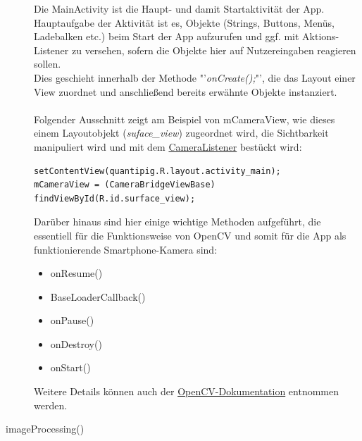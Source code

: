 \begin{description}
Die MainActivity ist die Haupt- und damit Startaktivität der App. Hauptaufgabe der Aktivität ist es, Objekte  (Strings, Buttons, Menüs, Ladebalken etc.) beim Start der App aufzurufen und ggf. mit Aktions-Listener zu versehen, sofern die Objekte hier auf Nutzereingaben reagieren sollen. \\
Dies geschieht innerhalb der Methode "'\textit{onCreate();}"', die das Layout einer View zuordnet und anschließend bereits erwähnte Objekte instanziert. \\
\\
Folgender Ausschnitt zeigt am Beispiel von mCameraView, wie dieses einem Layoutobjekt (\textcolor{lila}{\textit{suface\_view}})  zugeordnet wird, die Sichtbarkeit manipuliert wird und mit dem \hyperref[CameraListener]{CameraListener}  bestückt wird:

\lstset{language = JAVA}

\begin{lstlisting}
setContentView(quantipig.R.layout.activity_main);
mCameraView = (CameraBridgeViewBase) findViewById(R.id.surface_view);
\end{lstlisting}

Darüber hinaus sind hier einige wichtige Methoden aufgeführt, die essentiell für die Funktionsweise von OpenCV und somit für die App als funktionierende Smartphone-Kamera sind:
\begin{itemize}
\item onResume()
\item BaseLoaderCallback()
\item onPause()
\item onDestroy()
\item onStart()
\end{itemize}
Weitere Details können auch der \href{http://docs.opencv.org/2.4/doc/tutorials/introduction/android_binary_package/dev_with_OCV_on_Android.html#dev-with-ocv-on-android}{OpenCV-Dokumentation} entnommen werden.

\item[imageProcessing()]~\par
\label{imageProcessing}


\end{description}
